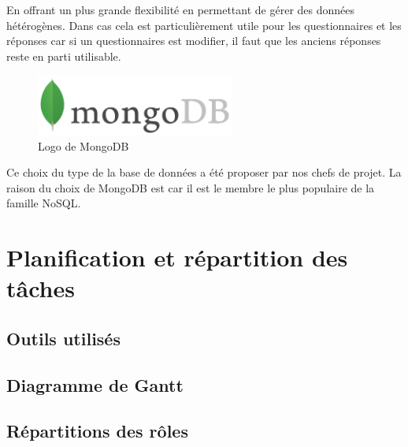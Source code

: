 En offrant un plus grande flexibilité en permettant de gérer des données hétérogènes. Dans cas cela est particulièrement utile pour les questionnaires et les réponses car si un questionnaires est modifier, il faut que les anciens réponses reste en parti utilisable.

\begin{figure}[H]
    \begin{center}
    \includegraphics[height=2.0cm]{img/mongodb}
    \end{center}
    \caption{Logo de MongoDB}
\end{figure}

Ce choix du type de la base de données a été proposer par nos chefs de projet. La raison du choix de MongoDB est car il est le membre le plus populaire de la famille NoSQL.   

\section{Planification et répartition des tâches}

\subsection{Outils utilisés}


\subsection{Diagramme de Gantt}


\subsection{Répartitions des rôles}
